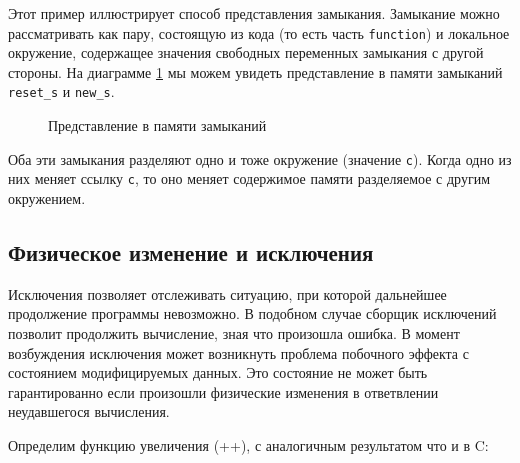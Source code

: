 Этот пример иллюстрирует способ представления замыкания. Замыкание можно
рассматривать как пару, состоящую из кода (то есть часть \texttt{function}) и
локальное окружение, содержащее значения свободных переменных замыкания с другой
стороны. На диаграмме \ref{fig:memory_representation_of_closures} мы можем
увидеть представление в памяти замыканий \texttt{reset\_s} и \texttt{new\_s}.

\begin{figure}[h]
	\caption{\label{fig:memory_representation_of_closures}Представление в памяти 
замыканий}
\end{figure}

Оба эти замыкания разделяют одно и тоже окружение (значение \texttt{c}). Когда
одно из них меняет ссылку \texttt{c}, то оно меняет содержимое памяти
разделяемое с другим окружением.

\subsection{Физическое изменение и исключения}
\label{subsec:physical_modifications_and_exceptions}

 Исключения позволяет отслеживать ситуацию, при которой дальнейшее продолжение
программы невозможно. В подобном случае сборщик исключений позволит продолжить
вычисление, зная что произошла ошибка. В момент возбуждения исключения может
возникнуть проблема побочного эффекта с состоянием модифицируемых данных. Это
состояние не может быть гарантированно если произошли физические изменения в
ответвлении неудавшегося вычисления.

Определим функцию увеличения (++), с аналогичным результатом что и в C:


